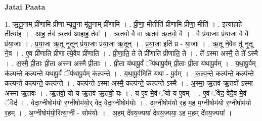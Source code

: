 \documentclass[17pt]{extarticle}
\begin{document}
\textbf{Jatai Paata} \newline

1. ऋ॒तू॒नाम् प्री॑णामि प्रीणा म्यृतू॒ना मृ॑तू॒नाम् प्री॑णामि । . प्री॒णा॒ मीतीति॑ प्रीणामि प्रीणा॒ मीति॑ । . इत्या॑हा॒हे तीत्या॑ह । . आ॒ह॒ र्तव॑ ऋ॒तव॑ आहाह॒ र्तवः॑ । . ऋ॒तवो॒ वै वा ऋ॒तव॑ ऋ॒तवो॒ वै । . वै प्र॑या॒जाः प्र॑या॒जा वै वै प्र॑या॒जाः । . प्र॒या॒जा ऋ॒तू नृ॒तून् प्र॑या॒जाः प्र॑या॒जा ऋ॒तून् । . प्र॒या॒जा इति॑ प्र - या॒जाः । . ऋ॒तू ने॒वैव र्तू नृ॒तू ने॒व । . ए॒व प्री॑णाति प्रीणा त्ये॒वैव प्री॑णाति । . प्री॒णा॒ति॒ ते ते प्री॑णाति प्रीणाति॒ ते । . ते᳚ ऽस्मा अस्मै॒ ते ते᳚ ऽस्मै । . अ॒स्मै॒ प्री॒ताः प्री॒ता अ॑स्मा अस्मै प्री॒ताः । . प्री॒ता य॑थापू॒र्वं ॅय॑थापू॒र्वम् प्री॒ताः प्री॒ता य॑थापू॒र्वम् । . य॒था॒पू॒र्वम् क॑ल्पन्ते कल्पन्ते यथापू॒र्वं ॅय॑थापू॒र्वम् क॑ल्पन्ते । . य॒था॒पू॒र्वमिति॑ यथा - पू॒र्वम् । . क॒ल्प॒न्ते॒ कल्प॑न्ते॒ कल्प॑न्ते कल्पन्ते कल्पन्ते॒ कल्प॑न्ते । . कल्प॑न्ते ऽस्मा अस्मै॒ कल्प॑न्ते॒ कल्प॑न्ते ऽस्मै । . अ॒स्मा॒ ऋ॒तव॑ ऋ॒तवो᳚ ऽस्मा अस्मा ऋ॒तवः॑ । . ऋ॒तवो॒ यो य ऋ॒तव॑ ऋ॒तवो॒ यः । . य ए॒व मे॒वं ॅयो य ए॒वम् । . ए॒वं ॅवेद॒ वेदै॒व मे॒वं ॅवेद॑ । . वेदा॒ग्नीषोम॑यो र॒ग्नीषोम॑यो॒र् वेद॒ वेदा॒ग्नीषोम॑योः । . अ॒ग्नीषोम॑यो र॒ह म॒ह म॒ग्नीषोम॑यो र॒ग्नीषोम॑यो र॒हम् । . अ॒ग्नीषोम॑यो॒रित्य॒ग्नी - सोम॑योः । . अ॒हम् दे॑वय॒ज्यया॑ देवय॒ज्यया॒ ऽह म॒हम् दे॑वय॒ज्यया᳚ । \newline
\end{document}
